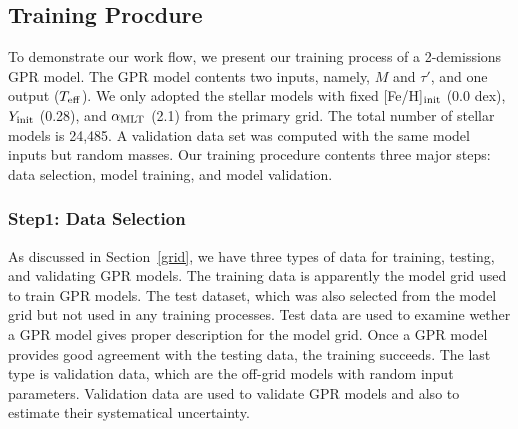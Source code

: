 \subsection{Training Procdure}\label{workflow}
To demonstrate our work flow, we present our training process of a 2-demissions GPR model. The GPR model contents two inputs, namely, $M$ and $\tau'$,  and one output ($T_{\rm eff}$). We only adopted the stellar models with fixed [Fe/H]$_{\rm init}$ (0.0 dex), $Y_{\rm init}$ (0.28), and $\alpha_{\rm MLT}$ (2.1) from the primary grid. The total number of stellar models is 24,485. A validation data set was computed with the same model inputs but random masses. Our training procedure contents three major steps: data selection, model training, and model validation.      

\subsubsection{Step1: Data Selection}

As discussed in Section~\ref{grid}, we have three types of data for training, testing, and validating GPR models. The training data is apparently the model grid used to train GPR models.  The test dataset, which was also selected from the model grid but not used in any training processes. Test data are used to examine wether a GPR model gives proper description for the model grid. Once a GPR model provides good agreement with the testing data, the training succeeds. The last type is validation data, which are the off-grid models with random input parameters. Validation data are used to validate GPR models and also to estimate their systematical uncertainty. 

